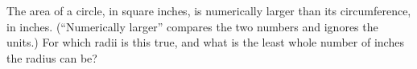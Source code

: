 The area of a circle, in square inches, is numerically larger than its circumference, in inches. (``Numerically larger'' compares the two numbers and ignores the units.) For which radii is this true, and what is the least whole number of inches the radius can be?
